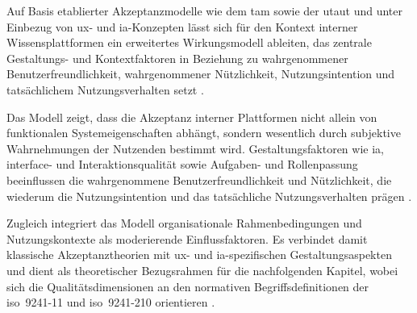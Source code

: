 Auf Basis etablierter Akzeptanzmodelle wie dem \acrshort{tam} sowie der \acrshort{utaut} und unter Einbezug von \Gls{ux}- und \Gls{ia}-Konzepten lässt sich für den Kontext interner Wissensplattformen ein erweitertes Wirkungsmodell ableiten, das zentrale Gestaltungs- und Kontextfaktoren in Beziehung zu wahrgenommener Benutzerfreundlichkeit, wahrgenommener Nützlichkeit, Nutzungsintention und tatsächlichem Nutzungsverhalten setzt \cite{102:Davis1989,103:Venkatesh2003,401:Garrett2011,303:Rosenfeld2015}.


Das Modell zeigt, dass die Akzeptanz interner Plattformen nicht allein von funktionalen Systemeigenschaften abhängt, sondern wesentlich durch subjektive Wahrnehmungen der Nutzenden bestimmt wird. Gestaltungsfaktoren wie \Gls{ia}, \Gls{interface}- und Interaktionsqualität sowie Aufgaben- und Rollenpassung beeinflussen die wahrgenommene Benutzerfreundlichkeit und Nützlichkeit, die wiederum die Nutzungsintention und das tatsächliche Nutzungsverhalten prägen \cite{102:Davis1989,103:Venkatesh2003}.

Zugleich integriert das Modell organisationale Rahmenbedingungen und Nutzungskontexte als moderierende Einflussfaktoren. Es verbindet damit klassische Akzeptanztheorien mit \Gls{ux}- und \Gls{ia}-spezifischen Gestaltungsaspekten und dient als theoretischer Bezugsrahmen für die nachfolgenden Kapitel, wobei sich die Qualitätsdimensionen an den normativen Begriffsdefinitionen der \acrshort{iso}~9241-11 und \acrshort{iso}~9241-210 orientieren \cite{501:ISO9241-11,500:ISO9241-210}.
